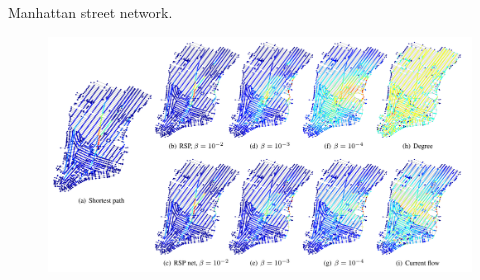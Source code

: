 \documentclass[13pt]{beamer}
\begin{document}
\begin{frame}[t,allowframebreaks]{Manhattan street network.}
    \begin{center}
    \begin{figure}
    \includegraphics[height=0.65\paperheight]{Images/heat2.png}
    \end{figure}
    \end{center}

    \end{frame}



\end{document}
